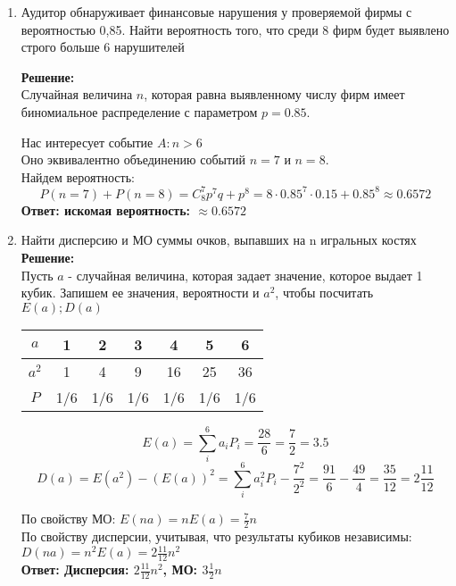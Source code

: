 \documentclass[a4paper,12pt]{article}
\begin{document}
\begin{enumerate}
\item Аудитор обнаруживает финансовые нарушения у проверяемой фирмы с вероятностью 0,85. Найти вероятность того, что среди 8 фирм будет выявлено строго больше 6 нарушителей 

\textbf{Решение:}\\
Случайная величина $n$, которая равна выявленному числу фирм имеет биномиальное распределение с параметром $p=0.85$.

Нас интересует событие $A: n>6$\\
Оно эквивалентно объединению событий $n=7$ и $n=8$.\\
Найдем вероятность:
$$P(n=7)+P(n=8)=C^7_8p^7q+p^8=8 \cdot 0.85^7 \cdot 0.15 +0.85^8\approx0.6572$$
\textbf{Ответ: искомая вероятность: $\approx0.6572$}


\item Найти дисперсию и МО суммы очков, выпавших на n игральных костях\\
\textbf{Решение:}\\
Пусть $a$ - случайная величина, которая задает значение, которое выдает 1 кубик. Запишем ее значения, вероятности и $a^2$, чтобы посчитать $E(a); D(a)$
\begin{center}
 \begin{tabular}{|c| c| c| c|c|c|c|} 
 \hline
 $a$ & 1 & 2 & 3 & 4 & 5& 6\\ 
 \hline
  $a^2$ & 1 & 4 & 9 & 16 & 25& 36\\ 
 \hline
$P$ & 1/6 & 1/6 & 1/6 & 1/6 & 1/6& 1/6\\ 
\hline
\end{tabular}
\end{center}
$$E(a)=\sum_i^{6} {a_i P_i} = \frac{28}{6}=\frac{7}{2}=3.5$$
$$D(a)=E(a^2) - (E(a))^2=\sum_i^{6} {a^2_i P_i}-\frac{7^2}{2^2} = \frac{91}{6}-\frac{49}{4}=\frac{35}{12}=2\frac{11}{12}$$

По свойству МО: $E(n a) = nE(a) = \frac{7}{2}n$\\
По свойству дисперсии, учитывая, что результаты кубиков независимы:\\ $D(n a) = n^2E(a) = 2\frac{11}{12}n^2$\\
\textbf{Ответ: Дисперсия: $2\frac{11}{12}n^2$, МО: $3\frac{1}{2}n$}


\end{enumerate}
\end{document}
